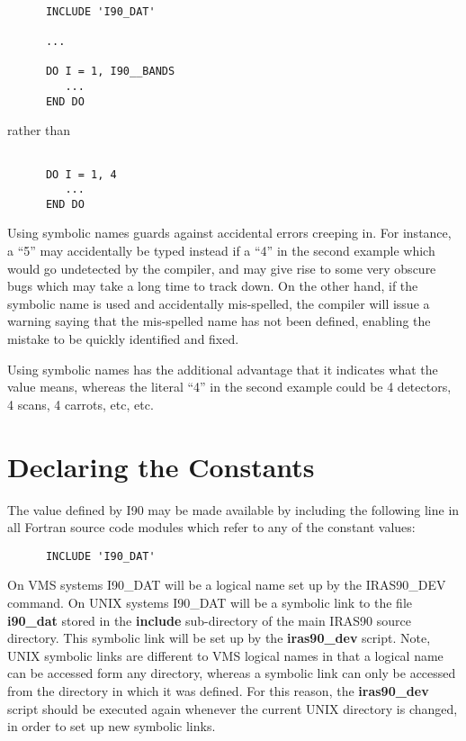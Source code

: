 \small
\begin{verbatim}

      INCLUDE 'I90_DAT'

      ...

      DO I = 1, I90__BANDS
         ...
      END DO

\end{verbatim}
\normalsize

rather than

\small
\begin{verbatim}

      DO I = 1, 4
         ...
      END DO

\end{verbatim}
\normalsize

Using symbolic names guards against accidental errors creeping in. For instance,
a ``5'' may accidentally be typed instead if a ``4'' in the second example which
would go undetected by the compiler, and may give rise to some very obscure bugs
which may take a long time to track down. On the other hand, if the symbolic
name is used and accidentally mis-spelled, the compiler will issue a warning
\footnotemark saying that the mis-spelled name has not been defined, enabling
the mistake to be quickly identified and fixed.

Using symbolic names has the additional advantage that it indicates what the
value means, whereas the literal ``4'' in the second example could be 4
detectors, 4 scans, 4 carrots, etc, etc.

\section{Declaring the Constants}

The value defined by I90 may be made available by including the following line
in all Fortran source code modules which refer to any of the constant values:

\small
\begin{verbatim}
      INCLUDE 'I90_DAT'
\end{verbatim}
\normalsize

On VMS systems I90\_DAT will be a logical name set up by the IRAS90\_DEV
command. On UNIX systems I90\_DAT will be a symbolic link to the file {\bf
i90\_dat} stored in the {\bf include} sub-directory of the main IRAS90
source directory. This symbolic link will be set up by the {\bf iras90\_dev} script.
Note, UNIX symbolic links are different to VMS logical names in that a logical
name can be accessed form any directory, whereas a symbolic link can only be
accessed from the directory in which it was defined. For this reason, the {\bf
iras90\_dev} script should be executed again whenever the current UNIX directory
is changed, in order to set up new symbolic links.

